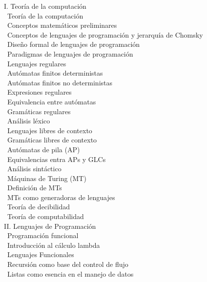 \documentclass[12pt, letterpaper, oneside]{article}
\newcommand{\topic}{{\color{darkgreen}{\Rectangle}}}
\newcommand{\subtopic}{{\enskip \color{darkblue}{\Rectangle}}}
\begin{document}
  \begin{center} 
  \begin{minipage}{5in}
  \begin{flushleft}
  {\large I. Teoría de la computación} \\[2ex]
  \topic ~Teoría de la computación \\
  \subtopic ~Conceptos matemáticos preliminares \\
  \subtopic ~Conceptos de lenguajes de programación y jerarquía de Chomsky \\
  \subtopic ~Diseño formal de lenguajes de programación \\
  \subtopic ~Paradigmas de lenguajes de programación \\
  \topic ~Lenguajes regulares \\
  \subtopic ~Autómatas finitos deterministas \\
  \subtopic ~Autómatas finitos no deterministas \\
  \subtopic ~Expresiones regulares \\
  \subtopic ~Equivalencia entre autómatas \\
  \subtopic ~Gramáticas regulares \\
  \subtopic ~Análisis léxico \\
  \topic ~Lenguajes libres de contexto \\
  \subtopic ~Gramáticas libres de contexto \\
  \subtopic ~Autómatas de pila (AP) \\
  \topic ~Equivalencias entra APs y GLCs \\
  \subtopic ~Análisis sintáctico \\
  \topic ~Máquinas de Turing (MT)\\
  \subtopic ~Definición de MTs \\
  \subtopic ~MTs como generadoras de lenguajes \\
  \subtopic ~Teoría de decibilidad \\
  \subtopic ~Teoría de computabilidad \\[2.5ex]
  {\large II. Lenguajes de Programación} \\[2ex]
  \topic ~Programación funcional \\
  \subtopic ~Introducción al cálculo lambda \\
  \subtopic ~Lenguajes Funcionales \\
  \subtopic ~Recursión como base del control de flujo \\
  \subtopic ~Listas como esencia en el manejo de datos \\

\end{flushleft}
\end{minipage}
\end{center}
\end{document}
